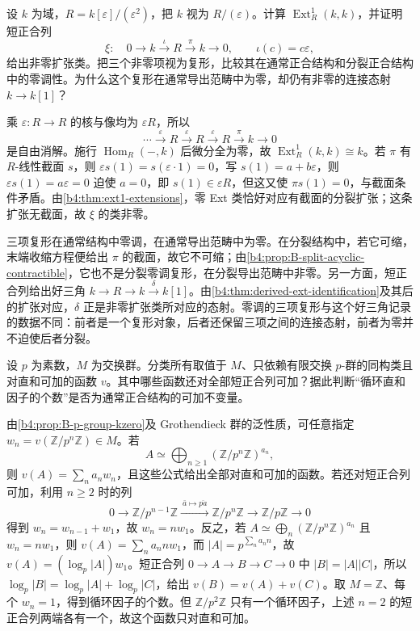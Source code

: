 \begin{exercise}\label{b4:ex:B-two-derived-zeroes}
	设 \(k\) 为域，\(R=k[\varepsilon]/(\varepsilon^2)\)，把 \(k\) 视为 \(R/(\varepsilon)\)。计算 \(\operatorname{Ext}_R^1(k,k)\)，并证明短正合列
	\[
		\xi:\quad 0\longrightarrow k\xrightarrow{\iota}R \xrightarrow{\pi}k\longrightarrow0, \qquad \iota(c)=c\varepsilon,
	\]
	给出非零扩张类。把三个非零项视为复形，比较其在通常正合结构和分裂正合结构中的零调性。为什么这个复形在通常导出范畴中为零，却仍有非零的连接态射 \(k\to k[1]\)？
\end{exercise}
\begin{solution}
	乘 \(\varepsilon:R\to R\) 的核与像均为 \(\varepsilon R\)，所以
	\[
		\cdots\xrightarrow{\varepsilon}R\xrightarrow{\varepsilon}R \xrightarrow{\varepsilon}R\xrightarrow{\pi}k\longrightarrow0
	\]
	是自由消解。施行 \(\operatorname{Hom}_R(-,k)\) 后微分全为零，故 \(\operatorname{Ext}_R^1(k,k)\cong k\)。若 \(\pi\) 有 \(R\)-线性截面 \(s\)，则 \(\varepsilon s(1)=s(\varepsilon\cdot1)=0\)，写 \(s(1)=a+b\varepsilon\)，则 \(\varepsilon s(1)=a\varepsilon=0\) 迫使 \(a=0\)，即 \(s(1)\in\varepsilon R\)，但这又使 \(\pi s(1)=0\)，与截面条件矛盾。由\cref{b4:thm:ext1-extensions}，零 Ext 类恰好对应有截面的分裂扩张；这条扩张无截面，故 \(\xi\) 的类非零。

	三项复形在通常结构中零调，在通常导出范畴中为零。在分裂结构中，若它可缩，末端收缩方程便给出 \(\pi\) 的截面，故它不可缩；由\cref{b4:prop:B-split-acyclic-contractible}，它也不是分裂零调复形，在分裂导出范畴中非零。另一方面，短正合列给出好三角 \(k\to R\to k\xrightarrow{\delta}k[1]\)。由\cref{b4:thm:derived-ext-identification}及其后的扩张对应，\(\delta\) 正是非零扩张类所对应的态射。零调的三项复形与这个好三角记录的数据不同：前者是一个复形对象，后者还保留三项之间的连接态射，前者为零并不迫使后者分裂。
\end{solution}

\begin{exercise}\label{b4:ex:B-finite-p-kzero}
	设 \(p\) 为素数，\(M\) 为交换群。分类所有取值于 \(M\)、只依赖有限交换 \(p\)-群的同构类且对直和可加的函数 \(v\)。其中哪些函数还对全部短正合列可加？据此判断“循环直和因子的个数”是否为通常正合结构的可加不变量。
\end{exercise}
\begin{solution}
	由\cref{b4:prop:B-p-group-kzero}及 Grothendieck 群的泛性质，可任意指定 \(w_n=v(\mathbb Z/p^n\mathbb Z)\in M\)。若
	\[
		A\simeq\bigoplus_{n\ge1}(\mathbb Z/p^n\mathbb Z)^{a_n},
	\]
	则 \(v(A)=\sum_na_nw_n\)，且这些公式给出全部对直和可加的函数。若还对短正合列可加，利用 \(n\ge2\) 时的列
	\[
		0\longrightarrow\mathbb Z/p^{n-1}\mathbb Z \xrightarrow{\ \bar a\mapsto\overline{pa}\ } \mathbb Z/p^n\mathbb Z\longrightarrow\mathbb Z/p\mathbb Z \longrightarrow0
	\]
	得到 \(w_n=w_{n-1}+w_1\)，故 \(w_n=nw_1\)。反之，若 \(A\simeq\bigoplus_n(\mathbb Z/p^n\mathbb Z)^{a_n}\) 且 \(w_n=nw_1\)，则 \(v(A)=\sum_na_nnw_1\)，而 \(|A|=p^{\sum_na_nn}\)，故 \(v(A)=(\log_p|A|)w_1\)。短正合列 \(0\to A\to B\to C\to0\) 中 \(|B|=|A||C|\)，所以 \(\log_p|B|=\log_p|A|+\log_p|C|\)，给出 \(v(B)=v(A)+v(C)\)。取 \(M=\mathbb Z\)、每个 \(w_n=1\)，得到循环因子的个数。但 \(\mathbb Z/p^2\mathbb Z\) 只有一个循环因子，上述 \(n=2\) 的短正合列两端各有一个，故这个函数只对直和可加。
\end{solution}


